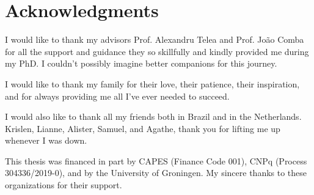 \manualmark
{} %

\begingroup
\let\clearpage\relax
\let\cleardoublepage\relax
\let\cleardoublepage\relax

\chapter*{Acknowledgments}

I would like to thank my advisors Prof. Alexandru Telea and Prof. Jo\~{a}o Comba for all the support and guidance they so skillfully and kindly provided me during my PhD. I couldn't possibly imagine better companions for this journey.

I would like to thank my family for their love, their patience, their inspiration, and for always providing me all I've ever needed to succeed.

I would also like to thank all my friends both in Brazil and in the Netherlands. Krislen, Lianne, Alister, Samuel, and Agathe, thank you for lifting me up whenever I was down.


\bigbreak

This thesis was financed in part by CAPES (Finance Code 001), CNPq (Process 304336/2019-0), and by the University of Groningen. 
My sincere thanks to these organizations for their support.

\endgroup



